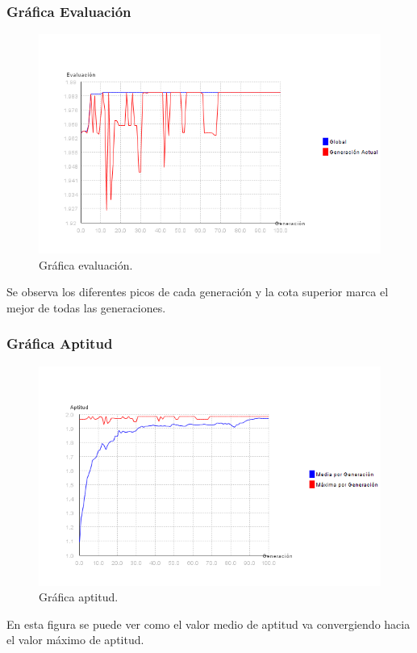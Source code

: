 \documentclass[12pt]{article}
\begin{document}
\subsubsection*{Gráfica Evaluación}
\begin{figure}[H]
\centering
\includegraphics[scale=0.4]{graficas/F1inicial_algoritmo}
\caption{Gráfica evaluación.}
\label{fig}
\end{figure}
	Se observa los diferentes picos de cada generación y la cota superior marca el mejor de todas las generaciones.

\subsubsection*{Gráfica Aptitud}
\begin{figure}[H]
\centering
\includegraphics[scale=0.4]{graficas/F1inicial_aptitud}
\caption{Gráfica aptitud.}
\label{fig}
\end{figure}
	En esta figura se puede ver como el valor medio de aptitud va convergiendo hacia el valor máximo de aptitud.
\end{document}
